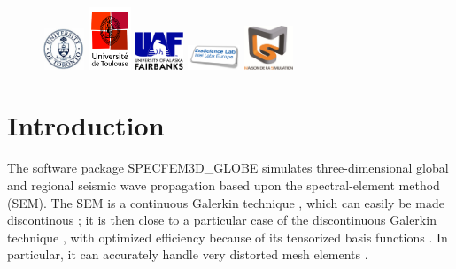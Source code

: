 \documentclass[oneside,english]{book}
\begin{document}
\begin{figure}[htbp]
\noindent \begin{centering}
\includegraphics[width=0.112\textwidth]{figures/logo_University_of_Toronto}\vspace*{2truemm}
\includegraphics[width=0.112\textwidth]{figures/logo_Univ_Toulouse}\vspace*{2truemm}
\includegraphics[width=0.130\textwidth]{figures/logo_Fairbanks}\vspace*{2truemm}
\includegraphics[width=0.140\textwidth]{figures/logo_Intel_Exascale_Labs}\vspace*{2truemm}
\includegraphics[width=0.130\textwidth]{figures/logo_Maison_Simulation}
\par\end{centering}
\end{figure}

\newpage{}

\tableofcontents{}

\chapter{Introduction}

The software package SPECFEM3D\_GLOBE simulates three-dimensional
global and regional seismic wave propagation based upon the spectral-element method (SEM).
The SEM is a continuous Galerkin technique \citep{TrKoLi08,PeKoLuMaLeCaLeMaLiBlNiBaTr11},
which can easily be made discontinous \citep{BeMaPa94,Ch00,KoWoHu02,ChCaVi03,LaWaBe05,Kop06,WiStBuGh10,AcKo11};
it is then close to a particular case of the discontinuous Galerkin technique \citep{ReHi73,LeRa74,Arn82,JoPi86,BoMaHe91,FaRi99,HuHuRa99,CoKaSh00,GiHeWa02,RiWh03,MoRi05,GrScSc06,AiMoMu06,BeLaPi06,DuKa06,DeSeWh08,PuAmKa09,WiStBuGh10,DeSe10,EtChViGl10}, with optimized efficiency because of its tensorized basis functions \citep{WiStBuGh10,AcKo11}.
In particular, it can accurately handle very distorted mesh elements \citep{OlSe11}.\\
\end{document}
